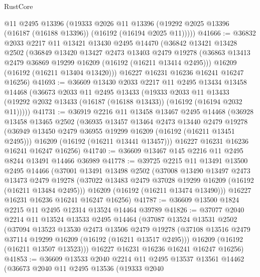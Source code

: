 \begin{lexlean}{RustCore}
\begin{coremodule}
      @11
      @2495
      @13396
      (@19333
        @2026
        @11
        @13396
        (@19292 @2025 @13396 (@16187 (@16188 @13396)) (@16192 (@16194 @2025 @11)))))
@41666 := @36832
    @2033
    @2217
    @11
    @13421
    @13430
    @2495
    @14470
    (@36842
      @13421
      @13428
      @2502
      (@36849
        @13420
        @13427
        @2473
        @13403
        @2479
        @19278
        (@36863 @13413 @2479 @36869 @19299 @16209 (@16192 (@16211 @13414 @2495)))
        @16209
        (@16192 (@16211 @13404 @13420)))
      @16227
      @16231
      @16236
      @16241
      @16247
      @16256)
@41693 := @36609
    @13430
    @2033
    @2217
    @11
    @2495
    @13434
    @13458
    @14468
    (@36673
      @2033
      @11
      @2495
      @13433
      (@19333
        @2033
        @11
        @13433
        (@19292 @2032 @13433 (@16187 (@16188 @13433)) (@16192 (@16194 @2032 @11)))))
@41731 := @36919
    @2216
    @11
    @13458
    @13467
    @2495
    @14468
    (@36928
      @13458
      @13465
      @2502
      (@36935
        @13457
        @13464
        @2473
        @13440
        @2479
        @19278
        (@36949 @13450 @2479 @36955 @19299 @16209 (@16192 (@16211 @13451 @2495)))
        @16209
        (@16192 (@16211 @13441 @13457)))
      @16227
      @16231
      @16236
      @16241
      @16247
      @16256)
@41740 := @36609 @13467 @145 @2216 @11 @2495 @8244 @13491 @14466 @36989
@41778 := @39725
    @2215
    @11
    @13491
    @13500
    @2495
    @14466
    (@37001
      @13491
      @13498
      @2502
      (@37008
        @13490
        @13497
        @2473
        @13473
        @2479
        @19278
        (@37022 @13483 @2479 @37028 @19299 @16209 (@16192 (@16211 @13484 @2495)))
        @16209
        (@16192 (@16211 @13474 @13490)))
      @16227
      @16231
      @16236
      @16241
      @16247
      @16256)
@41787 := @36609 @13500 @1824 @2215 @11 @2495 @12314 @13524 @14464 @39789
@41826 := @37077
    @2040
    @2214
    @11
    @13524
    @13533
    @2495
    @14464
    (@37087
      @13524
      @13531
      @2502
      (@37094
        @13523
        @13530
        @2473
        @13506
        @2479
        @19278
        (@37108 @13516 @2479 @37114 @19299 @16209 (@16192 (@16211 @13517 @2495)))
        @16209
        (@16192 (@16211 @13507 @13523)))
      @16227
      @16231
      @16236
      @16241
      @16247
      @16256)
@41853 := @36609
    @13533
    @2040
    @2214
    @11
    @2495
    @13537
    @13561
    @14462
    (@36673
      @2040
      @11
      @2495
      @13536
      (@19333
        @2040

\end{coremodule}
\end{lexlean}
